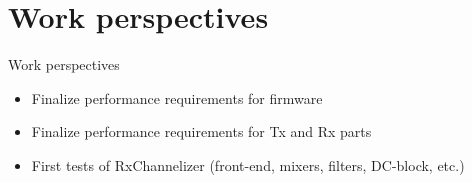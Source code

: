 \documentclass[ignorenonframetext,12pt]{beamer}
\begin{document}
\section{Work perspectives}
\begin{frame}{Work perspectives}
				\begin{itemize}
								\item Finalize performance requirements for firmware 
								\item Finalize performance requirements for Tx and Rx parts 
								\item First tests of RxChannelizer (front-end, mixers, filters,
												DC-block, etc.)
				\end{itemize}
\end{frame}
%
%
%
%
%
%
%
%
%
%
%
%
%
\end{document}
